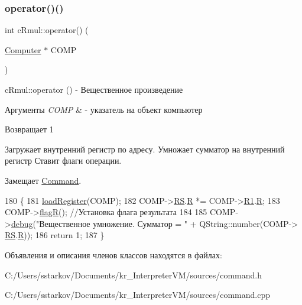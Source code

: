 \subsubsection{\texorpdfstring{operator()()}{operator()()}}
{\footnotesize\ttfamily int c\+Rmul\+::operator() (\begin{DoxyParamCaption}\item[{\hyperlink{class_computer}{Computer} $\ast$}]{C\+O\+MP }\end{DoxyParamCaption})\hspace{0.3cm}{\ttfamily [virtual]}}



c\+Rmul\+::operator () -\/ Вещественное произведение 


\begin{DoxyParams}{Аргументы}
{\em C\+O\+MP} & -\/ указатель на объект компьютер \\
\hline
\end{DoxyParams}
\begin{DoxyReturn}{Возвращает}
1
\end{DoxyReturn}
Загружает внутренний регистр по адресу. Умножает сумматор на внутренний регистр Ставит флаги операции. 

Замещает \hyperlink{class_command_a79939b66f3de892e91d7710844294716}{Command}.


\begin{DoxyCode}
180 \{
181     \hyperlink{class_command_aac6f368e7c9dbb357b3f00627d5dabfc}{loadRegister}(COMP);
182     COMP->\hyperlink{class_computer_a874503110664b3cf821118d2ce9c2b96}{RS}.\hyperlink{union_computer_1_1data_acbf8c96e22bd094bcbb4014818e3570d}{R} *= COMP->\hyperlink{class_computer_a0fbf84599b7db9d634a92afed443ee73}{R1}.\hyperlink{union_computer_1_1data_acbf8c96e22bd094bcbb4014818e3570d}{R};
183     COMP->\hyperlink{class_computer_aae860bb217270ec88e8ebf6fe2c2adc9}{flagR}(); \textcolor{comment}{//Установка флага результата}
184 
185     COMP->\hyperlink{class_computer_a10ca6c6b200630119201de16d7368e0f}{debug}(\textcolor{stringliteral}{"Вещественное умножение. Сумматор = "} + QString::number(COMP->
      \hyperlink{class_computer_a874503110664b3cf821118d2ce9c2b96}{RS}.\hyperlink{union_computer_1_1data_acbf8c96e22bd094bcbb4014818e3570d}{R}));
186     \textcolor{keywordflow}{return} 1;
187 \}
\end{DoxyCode}


Объявления и описания членов классов находятся в файлах\+:\begin{DoxyCompactItemize}
\item 
C\+:/\+Users/sstarkov/\+Documents/kr\+\_\+\+Interpreter\+V\+M/sources/command.\+h\item 
C\+:/\+Users/sstarkov/\+Documents/kr\+\_\+\+Interpreter\+V\+M/sources/command.\+cpp\end{DoxyCompactItemize}
